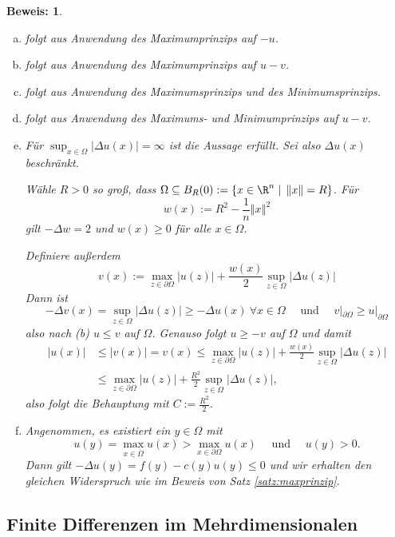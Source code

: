 \documentclass[
]{mycourse}
\theoremstyle{mythm}
\theoremstyle{break}
\newtheorem*{beweis}{Beweis:}
\newcommand{\norm}[1]{\left\Vert#1\right\Vert}		%
\begin{document}
\begin{beweis}
\begin{enumerate}[(a)]
\item folgt aus Anwendung des Maximumprinzips auf $-u$.
\item folgt aus Anwendung des Maximumprinzips auf $u-v$.
\item folgt aus Anwendung des Maximumsprinzips und des Minimumsprinzips.
\item folgt aus Anwendung des Maximums- und Minimumprinzips auf $u-v$.
\item Für $\sup_{x\in \Omega}|\Delta u(x)|=\infty$ ist die Aussage erfüllt. Sei also $\Delta u(x)$ beschränkt.

Wähle $R>0$ so groß, dass $\Omega\subseteq B_R(0):=\{ x\in \R^n\;|\; \norm{x}=R\}$.
Für
\[
w(x):=R^2-\frac{1}{n}\norm{x}^2
\]
gilt $-\Delta w=2$ und $w(x)\geq 0$ für alle $x\in \Omega$.

Definiere außerdem
\[
v(x):=\max_{z\in \partial \Omega} |u(z)| + \frac{w(x)}{2} \sup_{z\in \Omega}|\Delta u(z)|
\]
Dann ist
\[
-\Delta v(x)=  \sup_{z\in \Omega}|\Delta u(z)|\geq -\Delta u(x) \ \forall x\in \Omega \quad \mbox{ und } \quad
v|_{\partial \Omega} \geq u|_{\partial \Omega}
\]
also nach (b) $u\leq v$ auf $\Omega$. Genauso folgt $u\geq -v$ auf $\Omega$ und damit
\begin{align*}
|u(x)|&\leq |v(x)|=v(x)\leq \max_{z\in \partial \Omega} |u(z)| + \frac{w(x)}{2} \sup_{z\in \Omega}|\Delta u(z)|\\
&\leq \max_{z\in \partial \Omega} |u(z)| + \frac{R^2}{2} \sup_{z\in \Omega}|\Delta u(z)|,
\end{align*}
also folgt die Behauptung mit $C:=\frac{R^2}{2}$.
%
\item Angenommen, es existiert ein $y\in \Omega$ mit 
\[
u(y)=\max_{x\in \overline \Omega} u(x)>\max_{x\in \partial \Omega} u(x) \quad \mbox{ und } \quad u(y)>0.
\]
Dann gilt $-\Delta u(y)=f(y)-c(y)u(y)\leq 0$ und wir erhalten den gleichen Widerspruch wie im Beweis von Satz \ref{satz:maxprinzip}.
\end{enumerate}

\end{beweis}




\subsection{Finite Differenzen im Mehrdimensionalen}
\end{document}
